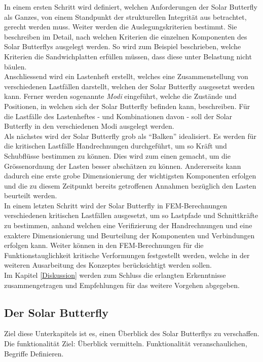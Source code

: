 In einem ersten Schritt wird definiert, welchen Anforderungen der Solar Butterfly als Ganzes, von einem Standpunkt der strukturellen Integrität aus betrachtet, gerecht werden muss. Weiter werden die Auslegungskriterien bestimmt. Sie beschreiben im Detail, nach welchen Kriterien die einzelnen Komponenten des Solar Butterflys ausgelegt werden. So wird zum Beispiel beschrieben, welche Kriterien die Sandwichplatten erfüllen müssen, dass diese unter Belastung nicht bäulen.\\
Anschliessend wird ein Lastenheft erstellt, welches eine Zusammenstellung von verschiedenen Lastfällen darstellt, welchen der Solar Butterfly ausgesetzt werden kann. Ferner werden sogenannte \emph{Modi} eingeführt, welche die Zustände und Positionen, in welchen sich der Solar Butterfly befinden kann, beschreiben. Für die Lastfälle des Lastenheftes - und Kombinationen davon - soll der Solar Butterfly in den verschiedenen Modi ausgelegt werden.\\
Als nächstes wird der Solar Butterfly grob als ``Balken'' idealisiert. Es werden für die kritischen Lastfälle Handrechnungen durchgeführt, um so Kräft und Schubflüsse bestimmen zu können. Dies wird zum einen gemacht, um die Grössenordnung der Lasten besser abschätzen zu können. Andererseits kann dadurch eine erste grobe Dimensionierung der wichtigsten Komponenten erfolgen und die zu diesem Zeitpunkt bereits getroffenen Annahmen bezüglich den Lasten beurteilt werden.\\
In einem letzten Schritt wird der Solar Butterfly in FEM-Berechnungen verschiedenen kritischen Lastfällen ausgesetzt, um so Lastpfade und Schnittkräfte zu bestimmen, anhand welchen eine Verifizierung der Handrechnungen und eine exaktere Dimensionierung und Beurteilung der Komponenten und Verbindungen erfolgen kann. Weiter können in den FEM-Berechnungen für die Funktionstauglichkeit kritische Verformungen festgestellt werden, welche in der weiteren Ausarbeitung des Konzeptes berücksichtigt werden sollen.\\
Im Kapitel \ref{Diskussion} werden zum Schluss die erlangten Erkenntnisse zusammengetragen und Empfehlungen für das weitere Vorgehen abgegeben.

\subsection{Der Solar Butterfly}
Ziel diese Unterkapitels ist es, einen Überblick des Solar Butterflys zu verschaffen. Die funktionalität
Ziel: Überblick vermitteln. Funktionalität veranschaulichen, Begriffe Definieren.

